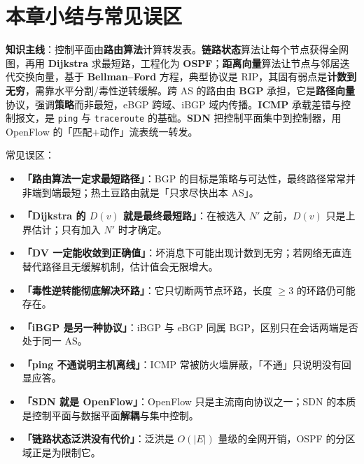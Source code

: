 \section{本章小结与常见误区}

\noindent\textbf{知识主线}：控制平面由\textbf{路由算法}计算转发表。\textbf{链路状态}算法让每个节点获得全网图，再用 \textbf{Dijkstra} 求最短路，工程化为 \textbf{OSPF}；\textbf{距离向量}算法让节点与邻居迭代交换向量，基于 \textbf{Bellman--Ford} 方程，典型协议是 RIP，其固有弱点是\textbf{计数到无穷}，需靠水平分割/毒性逆转缓解。跨 AS 的路由由 \textbf{BGP} 承担，它是\textbf{路径向量}协议，强调\textbf{策略}而非最短，eBGP 跨域、iBGP 域内传播。\textbf{ICMP} 承载差错与控制报文，是 \texttt{ping} 与 \texttt{traceroute} 的基础。\textbf{SDN} 把控制平面集中到控制器，用 OpenFlow 的「匹配$+$动作」流表统一转发。

常见误区：

\begin{itemize}
    \item \textbf{「路由算法一定求最短路径」}：BGP 的目标是策略与可达性，最终路径常常并非端到端最短；热土豆路由就是「只求尽快出本 AS」。
    \item \textbf{「Dijkstra 的 $D(v)$ 就是最终最短路」}：在被选入 $N'$ 之前，$D(v)$ 只是上界估计；只有加入 $N'$ 时才确定。
    \item \textbf{「DV 一定能收敛到正确值」}：坏消息下可能出现计数到无穷；若网络无直连替代路径且无缓解机制，估计值会无限增大。
    \item \textbf{「毒性逆转能彻底解决环路」}：它只切断两节点环路，长度 $\ge 3$ 的环路仍可能存在。
    \item \textbf{「iBGP 是另一种协议」}：iBGP 与 eBGP 同属 BGP，区别只在会话两端是否处于同一 AS。
    \item \textbf{「ping 不通说明主机离线」}：ICMP 常被防火墙屏蔽，「不通」只说明没有回显应答。
    \item \textbf{「SDN 就是 OpenFlow」}：OpenFlow 只是主流南向协议之一；SDN 的本质是控制平面与数据平面\textbf{解耦}与集中控制。
    \item \textbf{「链路状态泛洪没有代价」}：泛洪是 $O(|E|)$ 量级的全网开销，OSPF 的分区域正是为限制它。
\end{itemize}
